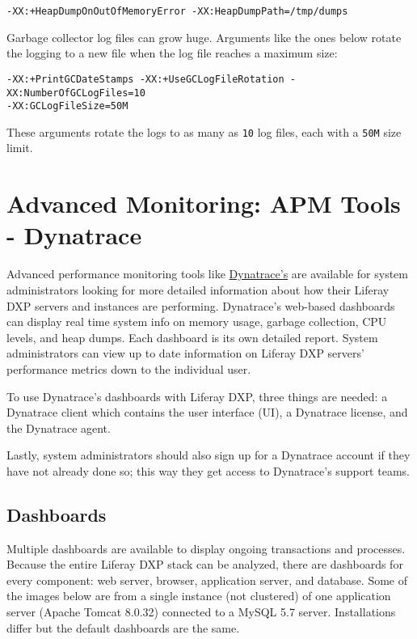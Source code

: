 \begin{verbatim}
-XX:+HeapDumpOnOutOfMemoryError -XX:HeapDumpPath=/tmp/dumps
\end{verbatim}

Garbage collector log files can grow huge. Arguments like the ones below
rotate the logging to a new file when the log file reaches a maximum
size:

\begin{verbatim}
-XX:+PrintGCDateStamps -XX:+UseGCLogFileRotation -XX:NumberOfGCLogFiles=10 
-XX:GCLogFileSize=50M
\end{verbatim}

These arguments rotate the logs to as many as \texttt{10} log files,
each with a \texttt{50M} size limit.

\section{Advanced Monitoring: APM Tools -
Dynatrace}\label{advanced-monitoring-apm-tools---dynatrace}

Advanced performance monitoring tools like
\href{https://www.dynatrace.com}{Dynatrace's} are available for system
administrators looking for more detailed information about how their
Liferay DXP servers and instances are performing. Dynatrace's web-based
dashboards can display real time system info on memory usage, garbage
collection, CPU levels, and heap dumps. Each dashboard is its own
detailed report. System administrators can view up to date information
on Liferay DXP servers' performance metrics down to the individual user.

To use Dynatrace's dashboards with Liferay DXP, three things are needed:
a Dynatrace client which contains the user interface (UI), a Dynatrace
license, and the Dynatrace agent.

Lastly, system administrators should also sign up for a Dynatrace
account if they have not already done so; this way they get access to
Dynatrace's support teams.

\subsection{Dashboards}\label{dashboards}

Multiple dashboards are available to display ongoing transactions and
processes. Because the entire Liferay DXP stack can be analyzed, there
are dashboards for every component: web server, browser, application
server, and database. Some of the images below are from a single
instance (not clustered) of one application server (Apache Tomcat
8.0.32) connected to a MySQL 5.7 server. Installations differ but the
default dashboards are the same.

